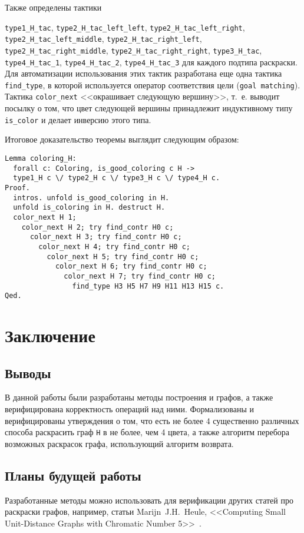 Также определены тактики 

{\tt type1\_H\_tac}, {\tt type2\_H\_tac\_left\_left}, {\tt type2\_H\_tac\_left\_right}, {\tt type2\_H\_tac\_left\_middle}, {\tt type2\_H\_tac\_right\_left}, {\tt type2\_H\_tac\_right\_middle}, {\tt type2\_H\_tac\_right\_right}, {\tt type3\_H\_tac}, {\tt type4\_H\_tac\_1}, {\tt type4\_H\_tac\_2}, {\tt type4\_H\_tac\_3} для каждого подтипа раскраски. Для автоматизации использования этих тактик разработана еще одна тактика {\tt find\_type}, в которой используется оператор соответствия цели ({\tt goal matching}). Тактика {\tt color\_next} <<окрашивает следующую вершину>>, т.~е. выводит посылку о том, что цвет следующей вершины принадлежит индуктивному типу {\tt is\_color} и делает инверсию этого типа.

Итоговое доказательство теоремы выглядит следующим образом:

\begin{verbatim}
Lemma coloring_H:
  forall c: Coloring, is_good_coloring c H ->
  type1_H c \/ type2_H c \/ type3_H c \/ type4_H c.
Proof.
  intros. unfold is_good_coloring in H. 
  unfold is_coloring in H. destruct H.
  color_next H 1;
    color_next H 2; try find_contr H0 c;
      color_next H 3; try find_contr H0 c;
        color_next H 4; try find_contr H0 c;
          color_next H 5; try find_contr H0 c;
            color_next H 6; try find_contr H0 c;
              color_next H 7; try find_contr H0 c;
                find_type H3 H5 H7 H9 H11 H13 H15 c.
Qed.
\end{verbatim}


\chapter{Заключение}

\section{Выводы}
В данной работы были разработаны методы построения и графов, а также верифицирована корректность операций над ними. Формализованы и верифицированы утверждения о том, что есть не более 4 существенно различных способа раскрасить граф {\tt H} в не более, чем 4 цвета, а также алгоритм перебора возможных раскрасок графа, использующий алгоритм возврата.

\section{Планы будущей работы}
Разработанные методы можно использовать для верификации других статей про раскраски графов, например, статьи Marijn~J.H.~Heule, <<Computing Small Unit-Distance Graphs with Chromatic Number 5>>~\cite{Huele}.

